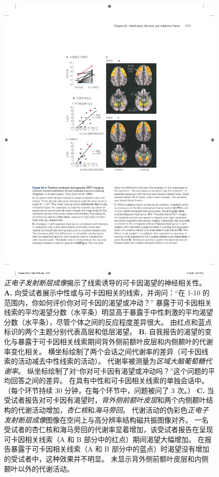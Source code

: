 \begin{figure}[htbp]
	\centering
	\includegraphics[width=0.7\linewidth]{chap43/fig_43_4}
	\caption{\textit{正电子发射断层成像}揭示了线索诱导的可卡因渴望的神经相关性\cite{grant1996activation}。
		\textbf{A.} 向受试者展示中性或与可卡因相关的线索，并询问：“在 1-10 的范围内，你如何评价你对可卡因的渴望或冲动？” 
		暴露于可卡因相关线索的平均渴望分数（水平条）明显高于暴露于中性刺激的平均渴望分数（水平条），尽管个体之间的反应程度差异很大。
		由红点和蓝点标识的两个主题分别代表高层和低层渴望。
		\textbf{B.} 自我报告的渴望的变化与暴露于可卡因相关线索期间背外侧前额叶皮层和内侧颞叶的代谢率变化相关。
		横坐标绘制了两个会话之间代谢率的差异（可卡因线索的活动减去中性线索的活动）。
		代谢率被测量为\textit{区域大脑葡萄糖代谢率}。
		纵坐标绘制了对“你对可卡因有渴望或冲动吗？”这个问题的平均回答之间的差异。
		在具有中性和可卡因相关线索的单独会话中。
		（每个环节持续 30 分钟，在每个环节中，问题被问了 3 次。）
		\textbf{C.} 当受试者报告对可卡因有渴望时，\textit{背外侧前额叶皮层}和两个内侧颞叶结构的代谢活动增加，\textit{杏仁核}和\textit{海马旁回}。
		代谢活动的伪彩色\textit{正电子发射断层成像}图像在空间上与高分辨率结构磁共振图像对齐。
		一名受试者的杏仁核和海马旁回的代谢率显着增加，该受试者报告在呈现可卡因相关线索（A 和 B 部分中的红点）期间渴望大幅增加。
		在报告暴露于可卡因相关线索（A 和 B 部分中的蓝点）时渴望没有增加的受试者中，这种效果并不明显。
		未显示背外侧前额叶皮层和内侧颞叶以外的代谢活动。}
	\label{fig:43_4}
\end{figure}



